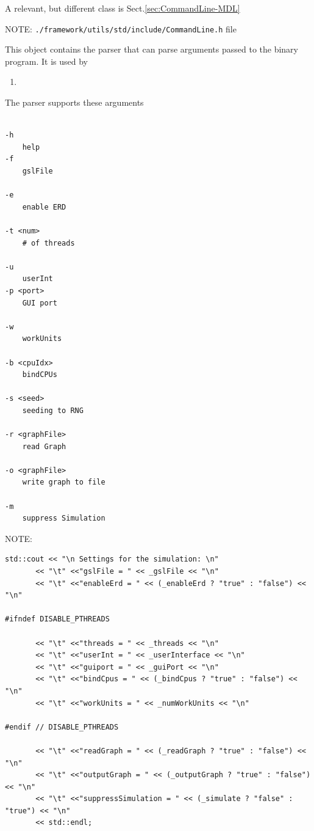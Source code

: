 A relevant, but different class is Sect.\ref{sec:CommandLine-MDL}

NOTE: \verb!./framework/utils/std/include/CommandLine.h! file

This object contains the parser that can parse arguments passed to the binary program. It is used by
\begin{enumerate}
  \item 
\end{enumerate}

The parser supports these arguments
\begin{verbatim}

-h 
	help
-f
	gslFile
	
-e 
	enable ERD
	
-t <num>
	# of threads
	
-u
	userInt
-p <port>
	GUI port
	
-w
	workUnits
	
-b <cpuIdx>
	bindCPUs
	
-s <seed>
	seeding to RNG
	
-r <graphFile>
	read Graph
	
-o <graphFile>
	write graph to file
	
-m
	suppress Simulation
\end{verbatim}

\begin{mdframed}

NOTE:
{\tiny
\begin{verbatim}
std::cout << "\n Settings for the simulation: \n"                          
       << "\t" <<"gslFile = " << _gslFile << "\n"                      
       << "\t" <<"enableErd = " << (_enableErd ? "true" : "false") << "\n"           
                                                  
#ifndef DISABLE_PTHREADS                                        
      
       << "\t" <<"threads = " << _threads << "\n"                      
       << "\t" <<"userInt = " << _userInterface << "\n"                       
       << "\t" <<"guiport = " << _guiPort << "\n"                      
       << "\t" <<"bindCpus = " << (_bindCpus ? "true" : "false") << "\n"             
       << "\t" <<"workUnits = " << _numWorkUnits << "\n"                      
                                                  
#endif // DISABLE_PTHREADS                                      
      
       << "\t" <<"readGraph = " << (_readGraph ? "true" : "false") << "\n"           
       << "\t" <<"outputGraph = " << (_outputGraph ? "true" : "false") << "\n"       
       << "\t" <<"suppressSimulation = " << (_simulate ? "false" : "true") << "\n"          
       << std::endl;

\end{verbatim}
}
\end{mdframed}



